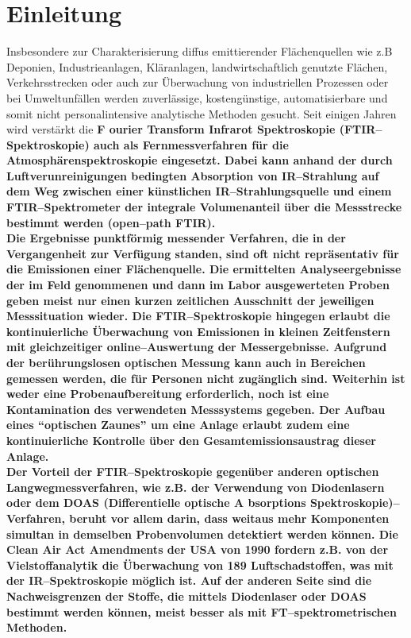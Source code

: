 \chapter{\label{einleitung}Einleitung}


Insbesondere zur Charakterisierung diffus emittierender
Fl\"{a}chenquellen wie z.B Deponien, Industrieanlagen, Kl\"{a}ranlagen,
landwirtschaftlich genutzte Fl\"{a}chen, Verkehrsstrecken oder auch
zur \"{U}berwachung von industriellen Prozessen oder bei
Umweltunf\"{a}llen werden zuverl\"{a}ssige, kosteng\"{u}nstige,
automatisierbare und somit nicht personalintensive analytische
Methoden gesucht. Seit einigen Jahren wird verst\"{a}rkt die \bf F\rm
ourier \bf T\rm ransform \bf I\rm nfrarot \bf S\rm pektroskopie
(FTIR--Spektroskopie) auch als Fernmessverfahren f\"{u}r die
Atmosph\"{a}renspektroskopie eingesetzt. Dabei kann anhand der durch
Luftverunreinigungen bedingten Absorption von IR--Strahlung auf
dem Weg zwischen einer k\"{u}nstlichen IR--Strahlungsquelle und einem
FTIR--Spektrometer der integrale Volumenanteil \"{u}ber die
Messstrecke bestimmt werden (open--path FTIR).\\

Die Ergebnisse punktf\"{o}rmig messender Verfahren, die in der
Vergangenheit zur Verf\"{u}gung standen, sind oft nicht repr\"{a}sentativ
f\"{u}r die Emissionen einer Fl\"{a}chenquelle. Die ermittelten
Analyseergebnisse der im Feld genommenen und dann im Labor
ausgewerteten Proben geben meist nur einen kurzen zeitlichen
Ausschnitt der jeweiligen Messsituation wieder. Die
FTIR--Spektroskopie hingegen erlaubt die kontinuierliche
\"{U}berwachung von Emissionen in kleinen Zeitfenstern mit
gleichzeitiger online--Auswertung der Messergebnisse. Aufgrund der
ber\"{u}hrungslosen optischen Messung kann auch in Bereichen gemessen
werden, die f\"{u}r Personen nicht zug\"{a}nglich sind. Weiterhin ist
weder eine Probenaufbereitung erforderlich, noch ist eine
Kontamination des verwendeten Messsystems gegeben. Der Aufbau
eines "`optischen Zaunes"' um eine Anlage erlaubt zudem eine
kontinuierliche Kontrolle \"{u}ber den Gesamtemissionsaustrag dieser
Anlage.\\

Der Vorteil der FTIR--Spektroskopie gegen\"{u}ber anderen optischen
Langwegmessverfahren, wie z.B. der Verwendung von Diodenlasern
oder dem DOAS (\bf D\rm ifferentielle \bf o\rm ptische \bf A\rm
b\-sorp\-ti\-ons \bf S\rm pektroskopie)--Verfahren, beruht vor
allem darin, dass weitaus mehr Komponenten simultan in demselben
Probenvolumen detektiert werden k\"{o}nnen. Die Clean Air Act
Amendments der USA von 1990 fordern z.B. von der Vielstoffanalytik
die \"{U}berwachung von 189 Luftschadstoffen, was mit der
IR--Spektroskopie m\"{o}glich ist. Auf der anderen Seite sind die
Nachweisgrenzen der Stoffe, die mittels Diodenlaser oder DOAS
bestimmt werden k\"{o}nnen, meist besser als mit FT--spektrometrischen
Methoden.\\

